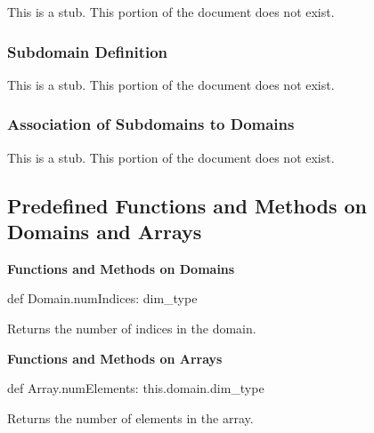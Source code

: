 This is a stub.  This portion of the document does not exist.

\subsubsection{Subdomain Definition}
\label{Subdomain_Definition}

This is a stub.  This portion of the document does not exist.

\subsubsection{Association of Subdomains to Domains}
\label{Association_of_Subdomains_to_Domains}

This is a stub.  This portion of the document does not exist.

\subsection{Predefined Functions and Methods on Domains and Arrays}

{\bf Functions and Methods on Domains}

\begin{chapel}
def Domain.numIndices: dim_type
\end{chapel}
Returns the number of indices in the domain.

{\bf Functions and Methods on Arrays}

\begin{chapel}
def Array.numElements: this.domain.dim_type
\end{chapel}
Returns the number of elements in the array.
